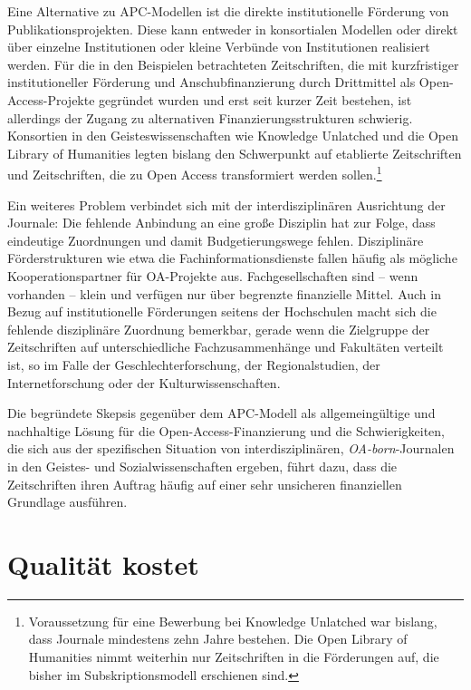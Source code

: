 \documentclass[a4paper,
fontsize=11pt,
oneside,
numbers=noperiodatend,
parskip=half-,
bibliography=totoc,
final
]{scrartcl}
\begin{document}
Eine Alternative zu APC-Modellen ist die direkte institutionelle
Förderung von Publikationsprojekten. Diese kann entweder in konsortialen
Modellen oder direkt über einzelne Institutionen oder kleine Verbünde
von Institutionen realisiert werden. Für die in den Beispielen
betrachteten Zeitschriften, die mit kurzfristiger institutioneller
Förderung und Anschubfinanzierung durch Drittmittel als
Open-Access-Projekte gegründet wurden und erst seit kurzer Zeit
bestehen, ist allerdings der Zugang zu alternativen
Finanzierungsstrukturen schwierig. Konsortien in den
Geisteswissenschaften wie Knowledge Unlatched und die Open Library of
Humanities legten bislang den Schwerpunkt auf etablierte Zeitschriften
und Zeitschriften, die zu Open Access transformiert werden
sollen.\footnote{Voraussetzung für eine Bewerbung bei Knowledge
  Unlatched war bislang, dass Journale mindestens zehn Jahre bestehen.
  Die Open Library of Humanities nimmt weiterhin nur Zeitschriften in
  die Förderungen auf, die bisher im Subskriptionsmodell erschienen
  sind.}

Ein weiteres Problem verbindet sich mit der interdisziplinären
Ausrichtung der Journale: Die fehlende Anbindung an eine große Disziplin
hat zur Folge, dass eindeutige Zuordnungen und damit Budgetierungswege
fehlen. Disziplinäre Förderstrukturen wie etwa die
Fachinformationsdienste fallen häufig als mögliche Kooperationspartner
für OA-Projekte aus. Fachgesellschaften sind -- wenn vorhanden -- klein
und verfügen nur über begrenzte finanzielle Mittel. Auch in Bezug auf
institutionelle Förderungen seitens der Hochschulen macht sich die
fehlende disziplinäre Zuordnung bemerkbar, gerade wenn die Zielgruppe
der Zeitschriften auf unterschiedliche Fachzusammenhänge und Fakultäten
verteilt ist, so im Falle der Geschlechterforschung, der
Regionalstudien, der Internetforschung oder der Kulturwissenschaften.

Die begründete Skepsis gegenüber dem APC-Modell als allgemeingültige und
nachhaltige Lösung für die Open-Access-Finanzierung und die
Schwierigkeiten, die sich aus der spezifischen Situation von
interdisziplinären, \emph{OA-born}-Journalen in den Geistes- und
Sozialwissenschaften ergeben, führt dazu, dass die Zeitschriften ihren
Auftrag häufig auf einer sehr unsicheren finanziellen Grundlage
ausführen.

\hypertarget{qualituxe4t-kostet}{%
\section{Qualität kostet}\label{qualituxe4t-kostet}}
\end{document}
